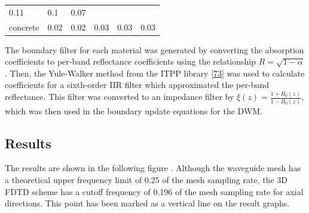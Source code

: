 \documentclass[]{scrreprt}
\begin{document}
\begin{longtable}[c]{@{}llllll@{}}
\begin{minipage}[t]{0.08\columnwidth}\raggedright\strut
0.11
\strut\end{minipage} &
\begin{minipage}[t]{0.08\columnwidth}\raggedright\strut
0.1
\strut\end{minipage} &
\begin{minipage}[t]{0.20\columnwidth}\raggedright\strut
0.07
\strut\end{minipage}\tabularnewline
\begin{minipage}[t]{0.30\columnwidth}\raggedright\strut
concrete
\strut\end{minipage} &
\begin{minipage}[t]{0.08\columnwidth}\raggedright\strut
0.02
\strut\end{minipage} &
\begin{minipage}[t]{0.08\columnwidth}\raggedright\strut
0.02
\strut\end{minipage} &
\begin{minipage}[t]{0.08\columnwidth}\raggedright\strut
0.03
\strut\end{minipage} &
\begin{minipage}[t]{0.08\columnwidth}\raggedright\strut
0.03
\strut\end{minipage} &
\begin{minipage}[t]{0.20\columnwidth}\raggedright\strut
0.03
\strut\end{minipage}\tabularnewline
\bottomrule
\end{longtable}

The boundary filter for each material was generated by converting the
absorption coefficients to per-band reflectance coefficients using the
relationship \(R=\sqrt{1-\alpha}\). Then, the Yule-Walker method from
the ITPP library {[}\protect\hyperlink{ref-ux5fitppux5f2013}{73}{]} was
used to calculate coefficients for a sixth-order IIR filter which
approximated the per-band reflectance. This filter was converted to an
impedance filter by \(\xi(z)=\frac{1+R_0(z)}{1-R_0(z)}\), which was then
used in the boundary update equations for the DWM.

\subsection{Results}\label{results}

The results are shown in the following figure
\text{(\ref{fig:reflectance})}. Although the waveguide mesh has a
theoretical upper frequency limit of 0.25 of the mesh sampling rate, the
3D FDTD scheme has a cutoff frequency of 0.196 of the mesh sampling rate
for axial directions. This point has been marked as a vertical line on
the result graphs.
\end{document}
